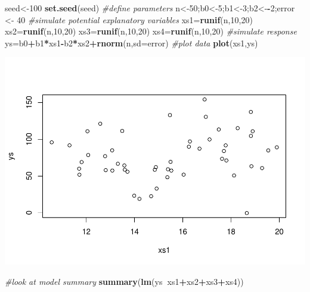 \documentclass[
]{book}
\newenvironment{Shaded}{\begin{snugshade}}{\end{snugshade}}
\newcommand{\CommentTok}[1]{\textcolor[rgb]{0.56,0.35,0.01}{\textit{#1}}}
\newcommand{\DataTypeTok}[1]{\textcolor[rgb]{0.13,0.29,0.53}{#1}}
\newcommand{\DecValTok}[1]{\textcolor[rgb]{0.00,0.00,0.81}{#1}}
\newcommand{\KeywordTok}[1]{\textcolor[rgb]{0.13,0.29,0.53}{\textbf{#1}}}
\newcommand{\NormalTok}[1]{#1}
\newcommand{\OperatorTok}[1]{\textcolor[rgb]{0.81,0.36,0.00}{\textbf{#1}}}
\newcommand{\StringTok}[1]{\textcolor[rgb]{0.31,0.60,0.02}{#1}}
\begin{document}
\begin{Shaded}
\begin{Highlighting}[]
\NormalTok{seed<-}\DecValTok{100}
\KeywordTok{set.seed}\NormalTok{(seed)}
\CommentTok{#define parameters}
\NormalTok{n<-}\DecValTok{50}\NormalTok{;b0<-}\DecValTok{5}\NormalTok{;b1<-}\DecValTok{3}\NormalTok{;b2<-}\OperatorTok{-}\DecValTok{2}\NormalTok{;error <-}\StringTok{ }\DecValTok{40}
\CommentTok{#simulate potential explanatory variables}
\NormalTok{xs1=}\KeywordTok{runif}\NormalTok{(n,}\DecValTok{10}\NormalTok{,}\DecValTok{20}\NormalTok{)}
\NormalTok{xs2=}\KeywordTok{runif}\NormalTok{(n,}\DecValTok{10}\NormalTok{,}\DecValTok{20}\NormalTok{)}
\NormalTok{xs3=}\KeywordTok{runif}\NormalTok{(n,}\DecValTok{10}\NormalTok{,}\DecValTok{20}\NormalTok{)}
\NormalTok{xs4=}\KeywordTok{runif}\NormalTok{(n,}\DecValTok{10}\NormalTok{,}\DecValTok{20}\NormalTok{)}
\CommentTok{#simulate response}
\NormalTok{ys=b0}\OperatorTok{+}\NormalTok{b1}\OperatorTok{*}\NormalTok{xs1}\OperatorTok{-}\NormalTok{b2}\OperatorTok{*}\NormalTok{xs2}\OperatorTok{+}\KeywordTok{rnorm}\NormalTok{(n,}\DataTypeTok{sd=}\NormalTok{error)}
\CommentTok{#plot data}
\KeywordTok{plot}\NormalTok{(xs1,ys)}
\end{Highlighting}
\end{Shaded}

\includegraphics{ECOMODbook_files/figure-latex/a7.5-1.pdf}

\begin{Shaded}
\begin{Highlighting}[]
\CommentTok{#look at model summary}
\KeywordTok{summary}\NormalTok{(}\KeywordTok{lm}\NormalTok{(ys}\OperatorTok{~}\NormalTok{xs1}\OperatorTok{+}\NormalTok{xs2}\OperatorTok{+}\NormalTok{xs3}\OperatorTok{+}\NormalTok{xs4))}
\end{Highlighting}
\end{Shaded}
\end{document}
